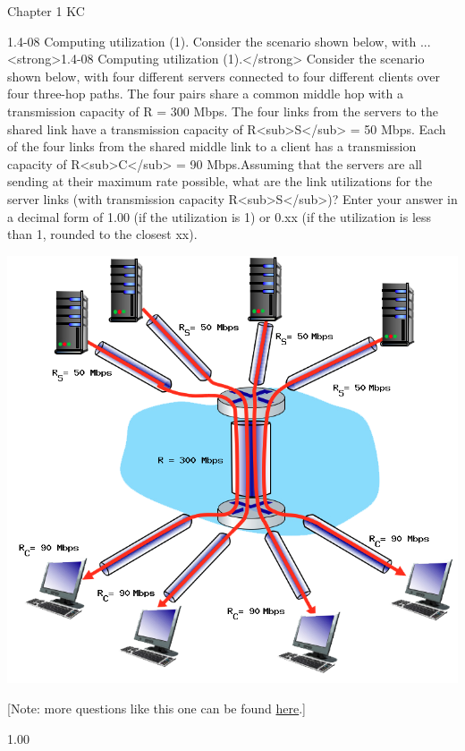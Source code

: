 \documentclass[a4paper]{article}
\begin{document}
\begin{quiz}{Chapter 1 KC}
\begin{shortanswer}[points=1]{1.4-08 Computing utilization (1). Consider the scenario shown below, with ...}
<strong>1.4-08 Computing utilization (1).</strong> Consider the scenario shown below, with four different servers connected to four different clients over four three-hop paths. The four pairs share a common middle hop with a transmission capacity of R = 300 Mbps. The four links from the servers to the shared link have a transmission capacity of R<sub>S</sub> = 50 Mbps. Each of the four links from the shared middle link to a client has a transmission capacity of R<sub>C</sub> = 90 Mbps.Assuming that the servers are all sending at their maximum rate possible, what are the link utilizations for the server links (with transmission capacity R<sub>S</sub>)? Enter your answer in a decimal form of 1.00 (if the utilization is 1) or 0.xx (if the utilization is less than 1, rounded to the closest xx). 
\begin{center}
\includegraphics[width=\linewidth]{figs/1.4.7.png}
\end{center}
 [Note: more questions like this one can be found \href{http://gaia.cs.umass.edu/kurose_ross/interactive/end-end-throughput-simple.php}{here}.]
\item* 1.00
\item *
\end{shortanswer}


\end{quiz}
\end{document}
